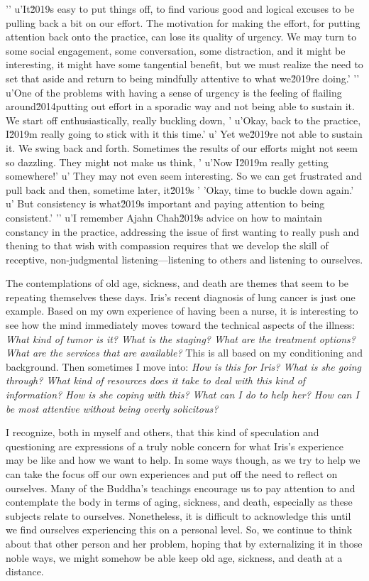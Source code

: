 '\n'
u'It\u2019s easy to put things off, to find various good and logical excuses to be pulling back a bit on our effort. The motivation for making the effort, for putting attention back onto the practice, can lose its quality of urgency. We may turn to some social engagement, some conversation, some distraction, and it might be interesting, it might have some tangential benefit, but we must realize the need to set that aside and return to being mindfully attentive to what we\u2019re doing.'
'\n'
u'One of the problems with having a sense of urgency is the feeling of flailing around\u2014putting out effort in a sporadic way and not being able to sustain it. We start off enthusiastically, really buckling down, '
u'Okay, back to the practice, I\u2019m really going to stick with it this time.'
u' Yet we\u2019re not able to sustain it. We swing back and forth. Sometimes the results of our efforts might not seem so dazzling. They might not make us think, '
u'Now I\u2019m really getting somewhere!'
u' They may not even seem interesting. So we can get frustrated and pull back and then, sometime later, it\u2019s '
'Okay, time to buckle down again.'
u' But consistency is what\u2019s important and paying attention to being consistent.'
'\n'
u'I remember Ajahn Chah\u2019s advice on how to maintain constancy in the practice, addressing the issue of first wanting to really push and thening to that wish with compassion requires 
that we develop the skill of receptive, non-judgmental 
listening---listening to others and listening to ourselves.


The contemplations of old age, sickness, and death are themes that seem 
to be repeating themselves these days. Iris's recent diagnosis of lung 
cancer is just one example. Based on my own experience of having been a 
nurse, it is interesting to see how the mind immediately moves toward 
the technical aspects of the illness: \emph{What kind of tumor is it? 
What is the staging? What are the treatment options? What are the 
services that are available?} This is all based on my conditioning and 
background. Then sometimes I move into: \emph{How is this for Iris? 
What is she going through? What kind of resources does it take to deal 
with this kind of information? How is she coping with this? What can I 
do to help her? How can I be most attentive without being overly 
solicitous?}

I recognize, both in myself and others, that this kind of speculation 
and questioning are expressions of a truly noble concern for what 
Iris's experience may be like and how we want to help. In some ways 
though, as we try to help we can take the focus off our own experiences 
and put off the need to reflect on ourselves. Many of the Buddha's 
teachings encourage us to pay attention to and contemplate the body in 
terms of aging, sickness, and death, especially as these subjects 
relate to ourselves. Nonetheless, it is difficult to acknowledge this 
until we find ourselves experiencing this on a personal level. So, we 
continue to think about that other person and her problem, hoping that 
by externalizing it in those noble ways, we might somehow be able keep 
old age, sickness, and death at a distance.

